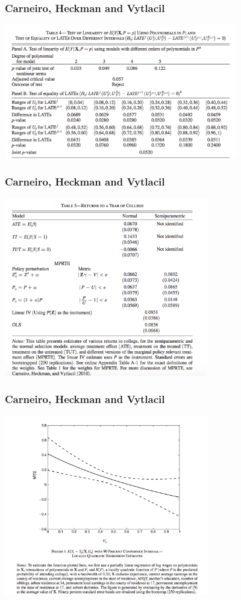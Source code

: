 \documentclass[xcolor=pdftex,dvipsnames,table,mathserif,aspectratio=169]{beamer}
\begin{document}
\begin{frame}
\frametitle{Carneiro, Heckman and Vytlacil}
\begin{center}
\includegraphics[width=4in]{./resources/chv_tab4}
\end{center}
\end{frame}

\begin{frame}
\frametitle{Carneiro, Heckman and Vytlacil}
\begin{center}
\includegraphics[width=3.5in]{./resources/chv_tab5}
\end{center}
\end{frame}

\begin{frame}
\frametitle{Carneiro, Heckman and Vytlacil}
\begin{center}
\includegraphics[width=3.5in]{./resources/chv_fig4}
\end{center}
\end{frame}
\end{document}
